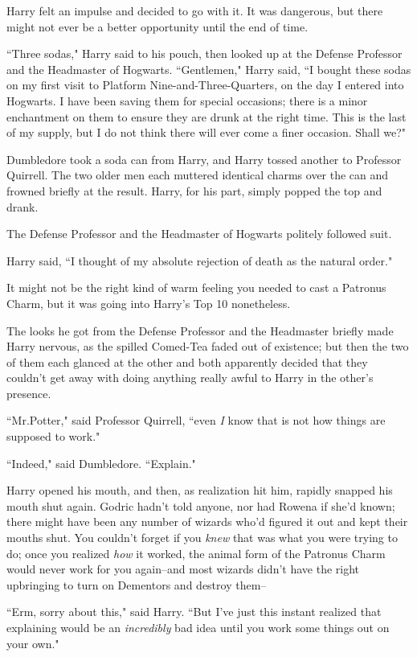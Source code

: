 Harry felt an impulse and decided to go with it. It was dangerous, but there might not ever be a better opportunity until the end of time.

``Three sodas," Harry said to his pouch, then looked up at the Defense Professor and the Headmaster of Hogwarts. ``Gentlemen," Harry said, ``I bought these sodas on my first visit to Platform Nine-and-Three-Quarters, on the day I entered into Hogwarts. I have been saving them for special occasions; there is a minor enchantment on them to ensure they are drunk at the right time. This is the last of my supply, but I do not think there will ever come a finer occasion. Shall we?"

Dumbledore took a soda can from Harry, and Harry tossed another to Professor Quirrell. The two older men each muttered identical charms over the can and frowned briefly at the result. Harry, for his part, simply popped the top and drank.

The Defense Professor and the Headmaster of Hogwarts politely followed suit.

Harry said, ``I thought of my absolute rejection of death as the natural order."

It might not be the right kind of warm feeling you needed to cast a Patronus Charm, but it was going into Harry's Top 10 nonetheless.

The looks he got from the Defense Professor and the Headmaster briefly made Harry nervous, as the spilled Comed-Tea faded out of existence; but then the two of them each glanced at the other and both apparently decided that they couldn't get away with doing anything really awful to Harry in the other's presence.

``Mr.\?Potter," said Professor Quirrell, ``even \emph{I} know that is not how things are supposed to work."

``Indeed," said Dumbledore. ``Explain."

Harry opened his mouth, and then, as realization hit him, rapidly snapped his mouth shut again. Godric hadn't told anyone, nor had Rowena if she'd known; there might have been any number of wizards who'd figured it out and kept their mouths shut. You couldn't forget if you \emph{knew} that was what you were trying to do; once you realized \emph{how} it worked, the animal form of the Patronus Charm would never work for you again\---and most wizards didn't have the right upbringing to turn on Dementors and destroy them\---

``Erm, sorry about this," said Harry. ``But I've just this instant realized that explaining would be an \emph{incredibly} bad idea until you work some things out on your own."

